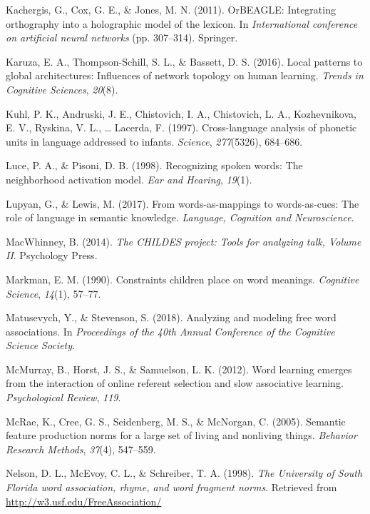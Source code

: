 \documentclass[english,floatsintext,man]{apa6}
\theoremstyle{definition}
\theoremstyle{definition}
\theoremstyle{definition}
\theoremstyle{remark}
\begin{document}
\hypertarget{ref-kachergis2011}{}
Kachergis, G., Cox, G. E., \& Jones, M. N. (2011). OrBEAGLE: Integrating
orthography into a holographic model of the lexicon. In
\emph{International conference on artificial neural networks} (pp.
307--314). Springer.

\hypertarget{ref-karuza2016}{}
Karuza, E. A., Thompson-Schill, S. L., \& Bassett, D. S. (2016). Local
patterns to global architectures: Influences of network topology on
human learning. \emph{Trends in Cognitive Sciences}, \emph{20}(8).

\hypertarget{ref-kuhl1997}{}
Kuhl, P. K., Andruski, J. E., Chistovich, I. A., Chistovich, L. A.,
Kozhevnikova, E. V., Ryskina, V. L., \ldots{} Lacerda, F. (1997).
Cross-language analysis of phonetic units in language addressed to
infants. \emph{Science}, \emph{277}(5326), 684--686.

\hypertarget{ref-luce1998}{}
Luce, P. A., \& Pisoni, D. B. (1998). Recognizing spoken words: The
neighborhood activation model. \emph{Ear and Hearing}, \emph{19}(1).

\hypertarget{ref-lupyan2017}{}
Lupyan, G., \& Lewis, M. (2017). From words-as-mappings to
words-as-cues: The role of language in semantic knowledge.
\emph{Language, Cognition and Neuroscience}.

\hypertarget{ref-macwhinney2014}{}
MacWhinney, B. (2014). \emph{The CHILDES project: Tools for analyzing
talk, Volume II}. Psychology Press.

\hypertarget{ref-markman90}{}
Markman, E. M. (1990). Constraints children place on word meanings.
\emph{Cognitive Science}, \emph{14}(1), 57--77.

\hypertarget{ref-matusevych2018}{}
Matusevych, Y., \& Stevenson, S. (2018). Analyzing and modeling free
word associations. In \emph{Proceedings of the 40th Annual Conference of
the Cognitive Science Society}.

\hypertarget{ref-mcmurray2012}{}
McMurray, B., Horst, J. S., \& Samuelson, L. K. (2012). Word learning
emerges from the interaction of online referent selection and slow
associative learning. \emph{Psychological Review}, \emph{119}.

\hypertarget{ref-mcrae2005}{}
McRae, K., Cree, G. S., Seidenberg, M. S., \& McNorgan, C. (2005).
Semantic feature production norms for a large set of living and
nonliving things. \emph{Behavior Research Methods}, \emph{37}(4),
547--559.

\hypertarget{ref-nelson1998}{}
Nelson, D. L., McEvoy, C. L., \& Schreiber, T. A. (1998). \emph{The
University of South Florida word association, rhyme, and word fragment
norms}. Retrieved from \url{http://w3.usf.edu/FreeAssociation/}
\end{document}

